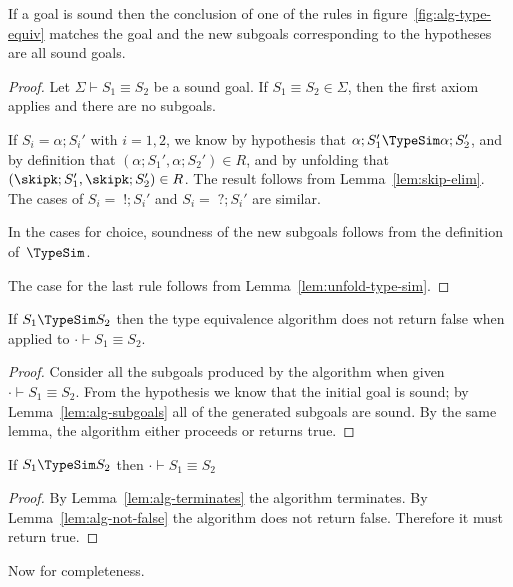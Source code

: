 \begin{lemma}
  \label{lem:alg-subgoals}
  If a goal is sound then the conclusion of one of the rules in
  figure~\ref{fig:alg-type-equiv} matches the goal and the new
  subgoals corresponding to the hypotheses are all sound goals.
\end{lemma}
%
\begin{proof}
  Let $\Sigma \vdash S_1 \equiv S_2$ be a sound goal. If
  $S_1 \equiv S_2 \in \Sigma$, then the first axiom applies and there
  are no subgoals.
  
  If $S_i = \alpha;S_i'$ with $i=1,2$, we know by hypothesis that
  $\alpha;S_1' \TypeSim \alpha;S_2'$, and by definition that
  $(\alpha;S_1', \alpha;S_2') \in R$, and by unfolding that
  $(\skipk;S_1',\skipk;S_2') \in R$. The result follows from
  Lemma~\ref{lem:skip-elim}.
  The cases of $S_i = \;!;S_i'$ and $S_i = \;?;S_i'$ are similar.

  In the cases for choice, soundness of the new subgoals follows from
  the definition of~$\TypeSim$.

  The case for the last rule follows from
  Lemma~\ref{lem:unfold-type-sim}.
\end{proof}

\begin{lemma}
  \label{lem:alg-not-false}
  If $S_1 \TypeSim S_2$ then the type equivalence algorithm does not
  return false when applied to $\cdot \vdash S_1 \equiv S_2$.
\end{lemma}
%
\begin{proof}
  Consider all the subgoals produced by the algorithm when given
  $\cdot\vdash S_1\equiv S_2$. From the hypothesis we know that the
  initial goal is sound; by Lemma~\ref{lem:alg-subgoals} all of the
  generated subgoals are sound.  By the same lemma, the algorithm
  either proceeds or returns true.
\end{proof}

\begin{theorem}
  \label{thm:alg-soundness}
  If $S_1 \TypeSim S_2$ then $\cdot \vdash S_1 \equiv S_2$  
\end{theorem}
%
\begin{proof}
  By Lemma~\ref{lem:alg-terminates} the algorithm terminates. By
  Lemma~\ref{lem:alg-not-false} the algorithm does not return
  false. Therefore it must return true.
\end{proof}

Now for completeness.

